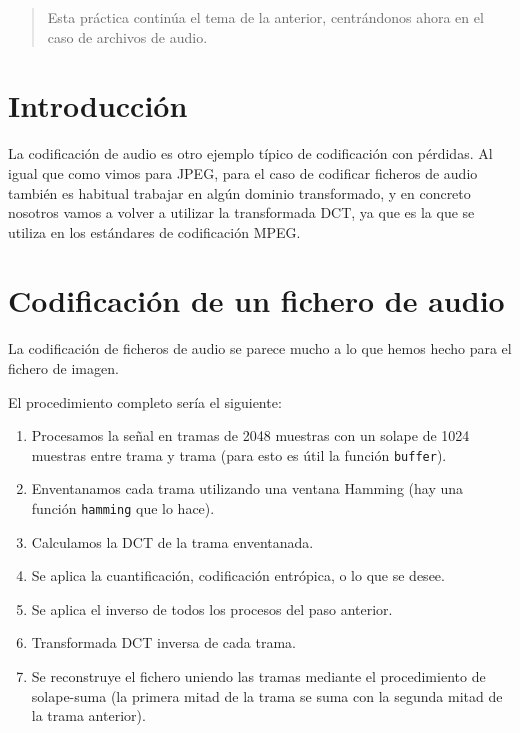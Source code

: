 \documentclass[es,practica]{uah}
\begin{document}

\maketitle

\begin{abstract}
Esta práctica continúa el tema de la anterior, centrándonos ahora en el caso de archivos de audio. 
\end{abstract}

\section{Introducción}
La codificación de audio es otro ejemplo típico de codificación con pérdidas. Al igual que como vimos para JPEG, para el caso de codificar ficheros de audio también es habitual trabajar en algún dominio transformado, y en concreto nosotros vamos a volver a utilizar la transformada DCT, ya que es la que se utiliza en los estándares de codificación MPEG.

\section{Codificación de un fichero de audio}

La codificación de ficheros de audio se parece mucho a lo que hemos hecho para el fichero de imagen. 

El procedimiento completo sería el siguiente:

\begin{enumerate}
	\item Procesamos la señal en tramas de 2048 muestras con un solape de 1024 muestras entre trama y trama (para esto es útil la función \texttt{buffer}). 
	\item Enventanamos cada trama utilizando una ventana Hamming (hay una función \texttt{hamming} que lo hace). 
	\item Calculamos la DCT de la trama enventanada.
	\item Se aplica la cuantificación, codificación entrópica, o lo que se desee. 
	\item Se aplica el inverso de todos los procesos del paso anterior.
	\item Transformada DCT inversa de cada trama.
	\item Se reconstruye el fichero uniendo las tramas mediante el procedimiento de solape-suma (la primera mitad de la trama se suma con la segunda mitad de la trama anterior).

\end{enumerate}
\end{document}
